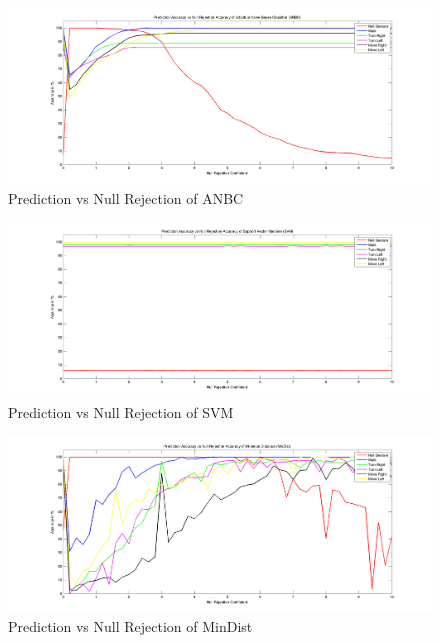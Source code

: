 \begin{figure}
	\centerline{\includegraphics[width=180mm]{figures/result/test-accuracy-anbc.jpg}}
	\caption{Prediction vs Null Rejection of ANBC}
	\label{ev:accuracy:anbc}
\end{figure}
\begin{figure}
	\centerline{\includegraphics[width=180mm]{figures/result/test-accuracy-svm.jpg}}
	\caption{Prediction vs Null Rejection of SVM}
	\label{ev:accuracy:svm}
\end{figure}
\begin{figure} 	
	\centerline{\includegraphics[width=180mm]{figures/result/test-accuracy-mindist.jpg}}
	\caption{Prediction vs Null Rejection of MinDist}
	\label{ev:accuracy:mindist}
\end{figure}


